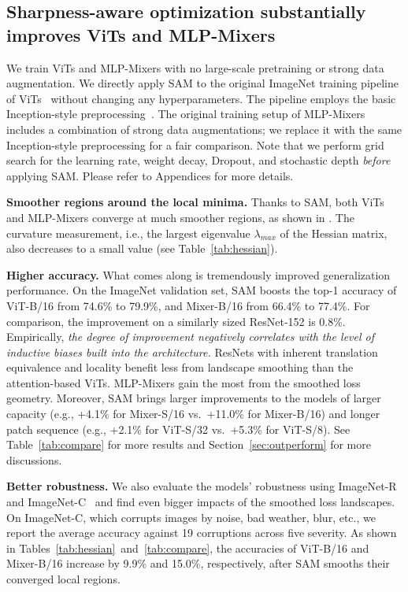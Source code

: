 \documentclass{article}
\begin{document}
\subsection{Sharpness-aware optimization substantially improves ViTs and MLP-Mixers}
We train ViTs and MLP-Mixers with no large-scale pretraining or strong data augmentation.
We directly apply SAM to the original ImageNet training pipeline of ViTs~\cite{dosovitskiy2021an} without changing any hyperparameters. The pipeline employs the basic Inception-style preprocessing~\cite{szegedy2016inception}. 
The original training setup of MLP-Mixers~\cite{tolstikhin2021mlpmixer} includes a combination of strong data augmentations;
we replace it with the same Inception-style preprocessing for a fair comparison. Note that we perform grid search for the learning rate, weight decay, Dropout, and stochastic depth \emph{before} applying SAM. Please refer to Appendices for more details.

\textbf{Smoother regions around the local minima.}
Thanks to SAM, both ViTs and MLP-Mixers converge at much smoother regions, as shown in . The curvature measurement, i.e., the largest eigenvalue $\lambda_{max}$ of the Hessian matrix, also decreases to a small value (see Table~\ref{tab:hessian}).

\textbf{Higher accuracy.}
What comes along is tremendously improved generalization performance. 
On the ImageNet validation set, SAM boosts the  top-1 accuracy of ViT-B/16 from 74.6\% to 79.9\%, and Mixer-B/16 from 66.4\% to 77.4\%.
For comparison, the improvement on a similarly sized ResNet-152 is 0.8\%.
Empirically, \textit{the degree of improvement negatively correlates with the level of inductive biases built into the architecture.}
ResNets with inherent translation equivalence and locality benefit less from landscape smoothing than the attention-based ViTs.
MLP-Mixers gain the most from the smoothed loss geometry.
Moreover, SAM brings larger improvements to the models of larger capacity (e.g., +4.1\% for Mixer-S/16 vs.\ +11.0\% for Mixer-B/16) and longer patch sequence (e.g., +2.1\% for ViT-S/32 vs.\ +5.3\% for ViT-S/8). See Table~\ref{tab:compare} for more results and Section~\ref{sec:outperform} for more discussions.




\textbf{Better robustness.}
We also evaluate the models' robustness using ImageNet-R~\cite{hendrycks2020faces} and ImageNet-C~\cite{hendrycks2019benchmarking} and find even bigger impacts of the smoothed loss landscapes. 
On ImageNet-C, which corrupts images by noise, bad weather, blur, etc., we report the average accuracy against 19 corruptions across five severity.
As shown in Tables~\ref{tab:hessian}~and~\ref{tab:compare}, the accuracies of ViT-B/16 and Mixer-B/16 increase by 9.9\% and 15.0\%, respectively, after SAM smooths their converged local regions.
\end{document}
